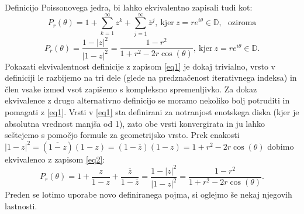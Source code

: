 \documentclass[mat1]{fmfdelo}
\begin{document}
    Definicijo Poissonovega jedra, bi lahko ekvivalentno zapisali tudi kot:
        \begin{equation}
            \label{eq1}
            P_r(\theta) = 1 + \sum_{k=1}^{\infty}{z^k} + \sum_{j=1}^{\infty}{\overline{z}^{j}},~\text{kjer}~z = r e^{i\theta} \in \mathbb{D},~~~\text{oziroma}
        \end{equation}
        \begin{equation}
            \label{eq2}
            P_r(\theta) = \frac{1 - |z|^2}{|1-z|^2} = \frac{1-r^2}{1+ r^2 - 2r \cos(\theta)},~\text{kjer}~z= re^{i\theta} \in \mathbb{D}.
        \end{equation}
    Pokazati ekvivalentnost definicije z zapisom \ref{eq1} je dokaj trivialno, vrsto v definiciji le razbijemo na tri dele (glede na predznačenost iterativnega indeksa) in člen vsake izmed vsot zapišemo s kompleksno spremenljivko. 
    Za dokaz ekvivalence z drugo alternativno definicijo se moramo nekoliko bolj potruditi in pomagati z \ref{eq1}. Vrsti v \ref{eq1} sta definirani za notranjost enotskega diska (kjer je absolutna vrednost manjša od 1), zato obe vrsti konvergirata in ju lahko seštejemo s pomočjo formule za geometrijsko vrsto. 
    Prek enakosti $|1 - z|^2 = (\overline{1 - z})(1 - z) = (1 - \overline{z})(1 - z) = 1 + r^2 - 2r \cos(\theta)$ dobimo ekvivalenco z zapisom \ref{eq2}:
    $$
        P_r(\theta) = 1 + \frac{z}{1 - z} + \frac{\overline{z}}{1 - \overline{z}} = \frac{1 - |z|^2}{|1 - z|^2} = \frac{1 - r^2}{1 + r^2 - 2r\cos(\theta)}.
    $$
    Preden se lotimo uporabe novo definiranega pojma, si oglejmo še nekaj njegovih lastnosti. 
    
\end{document}
